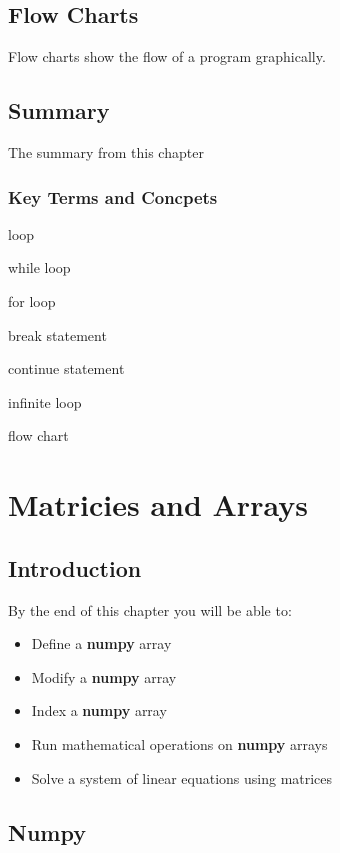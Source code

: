\documentclass{book}
\begin{document}
    \section{Flow Charts}\label{flow-charts}

    Flow charts show the flow of a program graphically.

    \section{Summary}\label{summary}

    The summary from this chapter

    \subsection{Key Terms and Concpets}\label{key-terms-and-concpets}

    loop

while loop

for loop

break statement

continue statement

infinite loop

flow chart

    \chapter{Matricies and Arrays}\label{matricies-and-arrays}

    \section{Introduction}\label{introduction}

    By the end of this chapter you will be able to:

\begin{itemize}
\item
  Define a \textbf{numpy} array
\item
  Modify a \textbf{numpy} array
\item
  Index a \textbf{numpy} array
\item
  Run mathematical operations on \textbf{numpy} arrays
\item
  Solve a system of linear equations using matrices
\end{itemize}

    \section{Numpy}\label{numpy}
\end{document}
